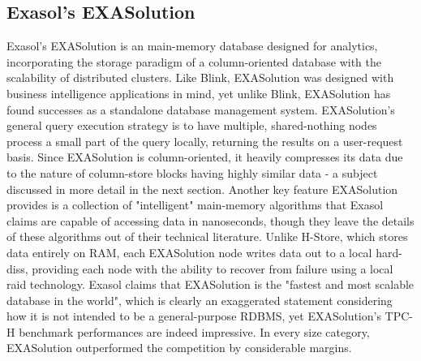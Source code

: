\documentclass[11pt,a4paper]{report}
\begin{document}
\subsection{Exasol's EXASolution}
Exasol's EXASolution is an main-memory database designed for analytics, incorporating the storage paradigm of a column-oriented database with the scalability of distributed clusters. \cite{exasolwp} Like Blink, EXASolution was designed with business intelligence applications in mind, yet unlike Blink, EXASolution has found successes as a standalone database management system.\cite{exasolwp} EXASolution's general query execution strategy is to have multiple, shared-nothing nodes process a small part of the query locally, returning the results on a user-request basis. \cite{exasolwp} Since EXASolution is column-oriented, it heavily compresses its data due to the nature of column-store blocks having highly similar data - a subject discussed in more detail in the next section. Another key feature EXASolution provides is a collection of "intelligent" main-memory algorithms that Exasol claims are capable of accessing data in nanoseconds, though they leave the details of these algorithms out of their technical literature. \cite{exasolwp} Unlike H-Store, which stores data entirely on RAM, each EXASolution node writes data out to a local hard-diss, providing each node with the ability to recover from failure using a local raid technology. \cite{exasolwp} Exasol claims that EXASolution is the "fastest and most scalable database in the world"\cite{exasolws}, which is clearly an exaggerated statement considering how it is not intended to be a general-purpose RDBMS, yet EXASolution's TPC-H benchmark performances are indeed impressive.\cite{exasolws} In every size category, EXASolution outperformed the competition by considerable margins. \cite{exasolws}
\end{document}
